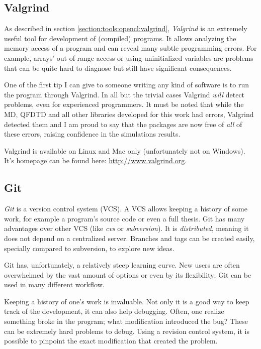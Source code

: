 \subsection*{Valgrind}

As described in section \ref{section:tools:opencl:valgrind}, \textit{Valgrind}
is an extremely useful tool for development of (compiled) programs. It allows
analyzing the memory access of a program and can reveal many subtle programming
errors. For example, arrays' out-of-range access or using uninitialized
variables are problems that can be quite hard to diagnose but still have
significant consequences.

One of the first tip I can give to someone writing any kind of software is to
run the program through Valgrind. In all but the trivial cases Valgrind
\textit{will} detect problems, even for experienced programmers. It must be
noted that while the MD, QFDTD and all other libraries developed for this work
had errors, Valgrind detected them and I am proud to say that the packages are
now free of \textit{all} of these errors, raising confidence in the simulations
results.

Valgrind is available on Linux and Mac only (unfortunately not on Windows). It's
homepage can be found here: \url{http://www.valgrind.org}.


\subsection*{Git}

\textit{Git} is a version control system (VCS). A VCS allows keeping a history
of some work, for example a program's source code or even a full thesis. Git
has many advantages over other VCS (like \textit{cvs} or \textit{subversion}).
It is \textit{distributed}, meaning it does not depend on a centralized server.
Branches and tags can be created easily, specially compared to subversion,
to explore new ideas.

Git has, unfortunately, a relatively steep learning curve. New users are often
overwhelmed by the vast amount of options or even by its flexibility; Git can
be used in many different workflow.

Keeping a history of one's work is invaluable. Not only it is a good way to keep
track of the development, it can also help debugging. Often, one realize
something broke in the program; what modification introduced the bug? These can
be extremely hard problems to debug. Using a revision control system, it is
possible to pinpoint the exact modification that created the problem.

